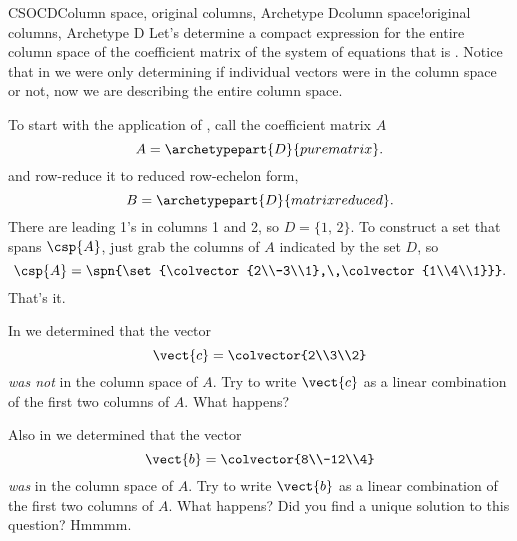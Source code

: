 \begin{example}{CSOCD}{Column space, original columns, Archetype D}{column space!original columns,  Archetype D}
Let's determine a compact expression for the entire column space of the coefficient matrix of the system of equations that is .  Notice that in  we were only determining if individual vectors were in the column space or not, now we are describing the entire column space.\par
%
To start with the application of , call the coefficient matrix $A$
%
\begin{equation*}
A=\archetypepart{D}{purematrix}.
\end{equation*}
%
and row-reduce it to reduced row-echelon form,
%
\begin{equation*}
B=\archetypepart{D}{matrixreduced}.
\end{equation*}
%
There are leading 1's in columns 1 and 2, so $D=\{1,\,2\}$.  To construct a set that spans $\csp{A}$, just grab the columns of $A$ indicated by the set $D$, so
%
\begin{equation*}
\csp{A}=\spn{\set{\colvector{2\\-3\\1},\,\colvector{1\\4\\1}}}.
\end{equation*}
%
That's it.\par
%
In  we determined that the vector
%
\begin{equation*}
\vect{c}=\colvector{2\\3\\2}
\end{equation*}
%
{\em was not} in the column space of $A$.  Try to write $\vect{c}$ as a linear combination of the first two columns of $A$.  What happens?\par
%
Also in  we determined that the vector 
%
\begin{equation*}
\vect{b}=\colvector{8\\-12\\4}
\end{equation*}
%
{\em was} in the column space of $A$.  Try to write $\vect{b}$ as a linear combination of the first two columns of $A$.  What happens?  Did you find a unique solution to this question?  Hmmmm.
%
\end{example}
%
